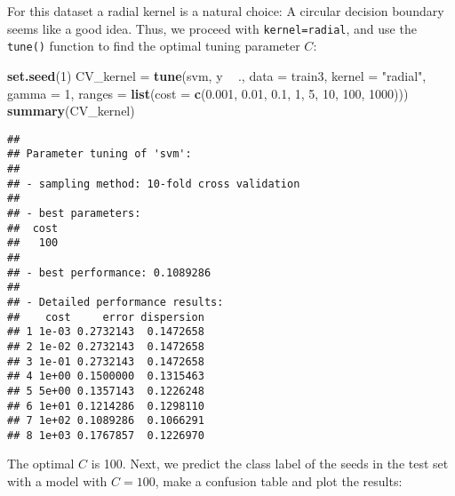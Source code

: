 \documentclass[10pt,ignorenonframetext,]{beamer}
\newenvironment{Shaded}{\begin{snugshade}}{\end{snugshade}}
\newcommand{\DataTypeTok}[1]{\textcolor[rgb]{0.13,0.29,0.53}{#1}}
\newcommand{\DecValTok}[1]{\textcolor[rgb]{0.00,0.00,0.81}{#1}}
\newcommand{\FloatTok}[1]{\textcolor[rgb]{0.00,0.00,0.81}{#1}}
\newcommand{\KeywordTok}[1]{\textcolor[rgb]{0.13,0.29,0.53}{\textbf{#1}}}
\newcommand{\NormalTok}[1]{#1}
\newcommand{\OperatorTok}[1]{\textcolor[rgb]{0.81,0.36,0.00}{\textbf{#1}}}
\newcommand{\StringTok}[1]{\textcolor[rgb]{0.31,0.60,0.02}{#1}}
\begin{document}
\begin{frame}[fragile]

For this dataset a radial kernel is a natural choice: A circular
decision boundary seems like a good idea. Thus, we proceed with
\texttt{kernel=\textquotesingle{}radial\textquotesingle{}}, and use the
\texttt{tune()} function to find the optimal tuning parameter \(C\):

\tiny

\begin{Shaded}
\begin{Highlighting}[]
\KeywordTok{set.seed}\NormalTok{(}\DecValTok{1}\NormalTok{)}
\NormalTok{CV_kernel =}\StringTok{ }\KeywordTok{tune}\NormalTok{(svm, y }\OperatorTok{~}\StringTok{ }\NormalTok{., }\DataTypeTok{data =}\NormalTok{ train3, }\DataTypeTok{kernel =} \StringTok{"radial"}\NormalTok{, }\DataTypeTok{gamma =} \DecValTok{1}\NormalTok{, }
    \DataTypeTok{ranges =} \KeywordTok{list}\NormalTok{(}\DataTypeTok{cost =} \KeywordTok{c}\NormalTok{(}\FloatTok{0.001}\NormalTok{, }\FloatTok{0.01}\NormalTok{, }\FloatTok{0.1}\NormalTok{, }\DecValTok{1}\NormalTok{, }\DecValTok{5}\NormalTok{, }\DecValTok{10}\NormalTok{, }\DecValTok{100}\NormalTok{, }\DecValTok{1000}\NormalTok{)))}
\KeywordTok{summary}\NormalTok{(CV_kernel)}
\end{Highlighting}
\end{Shaded}

\begin{verbatim}
## 
## Parameter tuning of 'svm':
## 
## - sampling method: 10-fold cross validation 
## 
## - best parameters:
##  cost
##   100
## 
## - best performance: 0.1089286 
## 
## - Detailed performance results:
##    cost     error dispersion
## 1 1e-03 0.2732143  0.1472658
## 2 1e-02 0.2732143  0.1472658
## 3 1e-01 0.2732143  0.1472658
## 4 1e+00 0.1500000  0.1315463
## 5 5e+00 0.1357143  0.1226248
## 6 1e+01 0.1214286  0.1298110
## 7 1e+02 0.1089286  0.1066291
## 8 1e+03 0.1767857  0.1226970
\end{verbatim}

\normalsize

\end{frame}

\begin{frame}[fragile]

The optimal \(C\) is 100. Next, we predict the class label of the seeds
in the test set with a model with \(C=100\), make a confusion table and
plot the results:

\scriptsize

\begin{Shaded}
\end{Shaded}

\end{frame}
\end{document}
